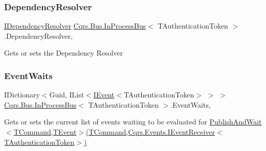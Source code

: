 \mbox{\label{classCqrs_1_1Bus_1_1InProcessBus_a2eafea26a2848880fdbf84717b8e60e1_a2eafea26a2848880fdbf84717b8e60e1}} 
\subsubsection{\texorpdfstring{Dependency\+Resolver}{DependencyResolver}}
{\footnotesize\ttfamily \hyperlink{interfaceCqrs_1_1Configuration_1_1IDependencyResolver}{I\+Dependency\+Resolver} \hyperlink{classCqrs_1_1Bus_1_1InProcessBus}{Cqrs.\+Bus.\+In\+Process\+Bus}$<$ T\+Authentication\+Token $>$.Dependency\+Resolver\hspace{0.3cm}{\ttfamily [get]}, {\ttfamily [protected]}}



Gets or sets the Dependency Resolver 

\mbox{\label{classCqrs_1_1Bus_1_1InProcessBus_a84de47f021786b0400e0635ec68b4ec1_a84de47f021786b0400e0635ec68b4ec1}} 
\subsubsection{\texorpdfstring{Event\+Waits}{EventWaits}}
{\footnotesize\ttfamily I\+Dictionary$<$Guid, I\+List$<$\hyperlink{interfaceCqrs_1_1Events_1_1IEvent}{I\+Event}$<$T\+Authentication\+Token$>$ $>$ $>$ \hyperlink{classCqrs_1_1Bus_1_1InProcessBus}{Cqrs.\+Bus.\+In\+Process\+Bus}$<$ T\+Authentication\+Token $>$.Event\+Waits\hspace{0.3cm}{\ttfamily [get]}, {\ttfamily [protected]}}



Gets or sets the current list of events waiting to be evaluated for \hyperlink{classCqrs_1_1Bus_1_1InProcessBus_a38c0684e313f42bfb36b40703db94ccb_a38c0684e313f42bfb36b40703db94ccb}{Publish\+And\+Wait$<$\+T\+Command,\+T\+Event$>$(\+T\+Command,\+Cqrs.\+Events.\+I\+Event\+Receiver$<$\+T\+Authentication\+Token$>$)} 


